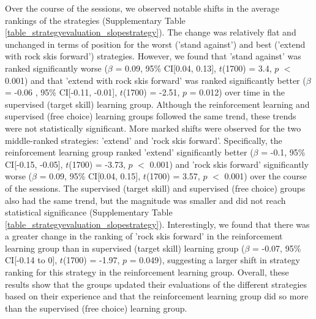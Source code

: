 \documentclass[pdflatex,sn-nature]{sn-jnl}%
\theoremstyle{thmstyleone}%
\theoremstyle{thmstyletwo}%
\theoremstyle{thmstylethree}%
\begin{document}
Over the course of the sessions, we observed notable shifts in the average rankings of the strategies (Supplementary Table \ref{table_strategyevaluation_slopestrategy}). The change was relatively flat and unchanged in terms of position for the worst ('stand against') and best ('extend with rock skis forward') strategies. However, we found that 'stand against' was ranked significantly worse ($\beta$ = 0.09, 95\% CI[0.04, 0.13], $t$(1700) = 3.4, $p$ $<$ 0.001)  and that 'extend with rock skis forward' was ranked significantly better ($\beta$ = -0.06 , 95\% CI[-0.11, -0.01], $t$(1700) = -2.51, $p$ = 0.012) over time in the supervised (target skill) learning group. Although the reinforcement learning and supervised (free choice) learning groups followed the same trend, these trends were not statistically significant. More marked shifts were observed for the two middle-ranked strategies: 'extend' and 'rock skis forward'. Specifically, the reinforcement learning group ranked 'extend' significantly better  ($\beta$ = -0.1, 95\% CI[-0.15, -0.05], $t$(1700) = -3.73, $p$ $<$ 0.001) and 'rock skis forward' significantly worse ($\beta$ = 0.09, 95\% CI[0.04, 0.15], $t$(1700) = 3.57, $p$ $<$ 0.001) over the course of the sessions. The supervised (target skill) and supervised (free choice) groups also had the same trend, but the magnitude was smaller and did not reach statistical significance (Supplementary Table \ref{table_strategyevaluation_slopestrategy}). Interestingly, we found that there was a greater change in the ranking of 'rock skis forward' in the reinforcement learning group than in supervised (target skill) learning group ($\beta$ = -0.07, 95\% CI[-0.14 to 0], $t$(1700) = -1.97, $p$ = 0.049), suggesting a larger shift in strategy ranking for this strategy in the reinforcement learning group. Overall, these results show that the groups updated their evaluations of the different strategies based on their experience and that the reinforcement learning group did so more than the supervised (free choice) learning group. 
\end{document}
